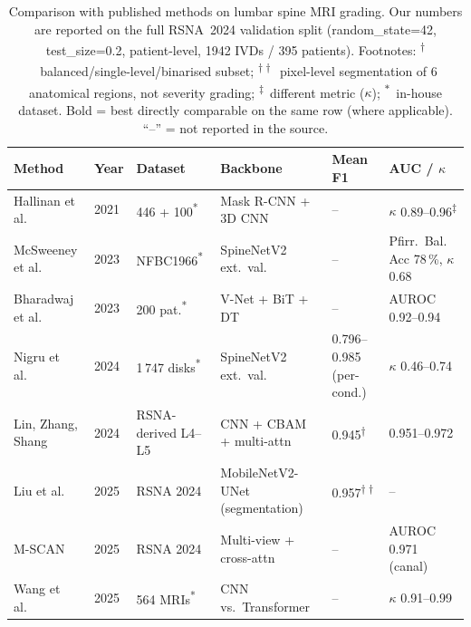 \begin{table}[t]
\centering
\caption{Comparison with published methods on lumbar spine MRI grading. Our
         numbers are reported on the full RSNA~2024 validation split
         (random\_state=42, test\_size=0.2, patient-level, 1942 IVDs / 395
         patients). Footnotes:
         \textsuperscript{$\dagger$}~balanced/single-level/binarised subset;
         \textsuperscript{$\dagger\dagger$}~pixel-level segmentation of 6
         anatomical regions, not severity grading;
         \textsuperscript{$\ddagger$}~different metric ($\kappa$);
         \textsuperscript{$*$}~in-house dataset. Bold = best directly
         comparable on the same row (where applicable). ``--'' = not reported
         in the source.}
\label{tab:sota}
\small
\setlength{\tabcolsep}{4pt}
\begin{tabular}{@{}llllll@{}}
\toprule
Method & Year & Dataset & Backbone & Mean F1 & AUC / $\kappa$ \\
\midrule
Hallinan et al.~\cite{hallinan2021stenosis}            & 2021 & 446 + 100\textsuperscript{*}   & Mask R-CNN + 3D CNN          & --          & $\kappa$ 0.89--0.96\textsuperscript{$\ddagger$} \\
McSweeney et al.~\cite{mcsweeney2023spinenet}          & 2023 & NFBC1966\textsuperscript{*}    & SpineNetV2 ext.\ val.        & --          & Pfirr.\ Bal.\,Acc 78\,\%, $\kappa$ 0.68 \\
Bharadwaj et al.~\cite{bharadwaj2023interpretable}     & 2023 & 200 pat.\textsuperscript{*}    & V-Net + BiT + DT             & --          & AUROC 0.92--0.94 \\
Nigru et al.~\cite{nigru2024spinenetv2}                & 2024 & 1\,747 disks\textsuperscript{*} & SpineNetV2 ext.\ val.       & 0.796--0.985 (per-cond.) & $\kappa$ 0.46--0.74 \\
Lin, Zhang, Shang~\cite{lin2024multiattention}         & 2024 & RSNA-derived L4--L5 & CNN + CBAM + multi-attn       & 0.945\textsuperscript{$\dagger$} & 0.951--0.972 \\
Liu et al.~\cite{liu2025rsna}                          & 2025 & RSNA 2024            & MobileNetV2-UNet (segmentation) & 0.957\textsuperscript{$\dagger\dagger$} & -- \\
M-SCAN~\cite{hong2025mscan}                            & 2025 & RSNA 2024            & Multi-view + cross-attn       & --          & AUROC 0.971 (canal) \\
Wang et al.~\cite{wang2025cnntransformer}              & 2025 & 564 MRIs\textsuperscript{*} & CNN vs.\ Transformer        & --          & $\kappa$ 0.91--0.99 \\

\end{tabular}
\end{table}
